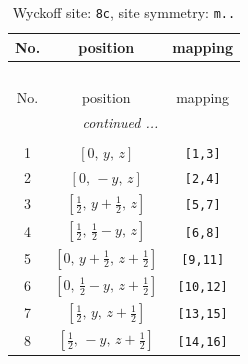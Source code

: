 \documentclass[fleqn,8pt]{jsarticle}
\begin{document}
\begin{longtable}{ccc}
\caption{Wyckoff site: {\tt 8c}, site symmetry: {\tt m..}}
 \\
 \hline \hline
No. & position & mapping \\ \hline \endfirsthead

\multicolumn{2}{l}{\tablename\ \thetable{}} \\
 \hline \hline
No. & position & mapping \\ \hline \endhead

 \hline \hline
\multicolumn{2}{r}{\footnotesize\it continued ...} \\ \endfoot

 \hline \hline
\multicolumn{2}{r}{} \\ \endlastfoot

1 & $\left[ 0,\, y,\, z \right]$ & {\tt [1,3]} \\ \hline
2 & $\left[ 0,\, - y,\, z \right]$ & {\tt [2,4]} \\ \hline
3 & $\left[ \frac{1}{2},\, y + \frac{1}{2},\, z \right]$ & {\tt [5,7]} \\ \hline
4 & $\left[ \frac{1}{2},\, \frac{1}{2} - y,\, z \right]$ & {\tt [6,8]} \\ \hline
5 & $\left[ 0,\, y + \frac{1}{2},\, z + \frac{1}{2} \right]$ & {\tt [9,11]} \\ \hline
6 & $\left[ 0,\, \frac{1}{2} - y,\, z + \frac{1}{2} \right]$ & {\tt [10,12]} \\ \hline
7 & $\left[ \frac{1}{2},\, y,\, z + \frac{1}{2} \right]$ & {\tt [13,15]} \\ \hline
8 & $\left[ \frac{1}{2},\, - y,\, z + \frac{1}{2} \right]$ & {\tt [14,16]} \\
\end{longtable}
\renewcommand{\arraystretch}{1.2}
\end{document}
